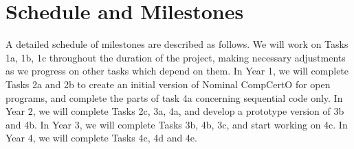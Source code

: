\section{Schedule and Milestones}

A detailed schedule of milestones are described as follows.
We will work on Tasks 1a, 1b, 1c throughout the duration of the project,
making necessary adjustments as we progress on other tasks
which depend on them.
In Year 1, 
we will complete Tasks 2a and 2b to
create an initial version of Nominal CompCertO for open programs,
and complete the parts of task 4a concerning sequential code only.
In Year 2, we will complete Tasks 2c, 3a, 4a, and
develop a prototype version of 3b and 4b.
In Year 3, 
we will complete Tasks 3b, 4b, 3c,
and start working on 4c.
In Year 4, we will complete Tasks 4c, 4d and 4e.


